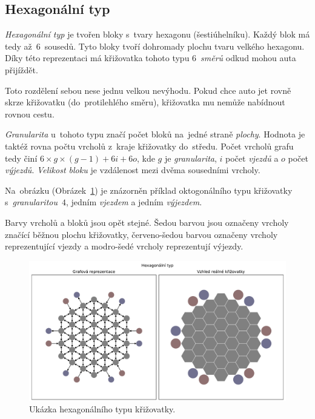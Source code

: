 \subsection{Hexagonální typ}\label{subsec:hexagonalni-typ}

\emph{Hexagonální typ} je tvořen bloky s~tvary hexagonu (šestiúhelníku).
Každý blok má tedy až~$6$~sousedů.
Tyto bloky tvoří dohromady plochu tvaru velkého hexagonu.
Díky této reprezentaci má křižovatka tohoto typu $6$~\emph{směrů} odkud mohou auta přijíždět.

Toto rozdělení sebou nese jednu velkou nevýhodu.
Pokud chce auto jet rovně skrze křižovatku (do~protilehlého směru), křižovatka mu nemůže nabídnout rovnou cestu.

\emph{Granularita} u~tohoto typu značí počet bloků na~jedné straně \emph{plochy}.
Hodnota je taktéž rovna počtu vrcholů z~kraje křižovatky do~středu.
Počet vrcholů grafu tedy činí $6 \times g \times (g-1) + 6i + 6o$,
kde $g$ je \emph{granularita}, $i$ počet \emph{vjezdů} a $o$ počet \emph{výjezdů}.
\emph{Velikost bloku} je vzdálenost mezi dvěma sousedními vrcholy.

Na~obrázku (Obrázek~\ref{fig:hexagonal_type_graph}) je znázorněn příklad oktogonálního typu křižovatky s~\emph{granularitou}~$4$,
jedním \emph{vjezdem} a jedním \emph{výjezdem}.

Barvy vrcholů a bloků jsou opět stejné.
Šedou barvou jsou označeny vrcholy značící běžnou plochu křižovatky,
červeno-šedou barvou označeny vrcholy reprezentující vjezdy a modro-šedé vrcholy reprezentují výjezdy.

\begin{figure}[h]
	\centering
	\includegraphics[width=\textwidth]{../img/Hexagonal_grid}
	\caption{Ukázka hexagonálního typu křižovatky.}
	\label{fig:hexagonal_type_graph}
\end{figure}
